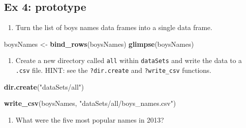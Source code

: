 \documentclass[]{book}
\newenvironment{Shaded}{\begin{snugshade}}{\end{snugshade}}
\newcommand{\KeywordTok}[1]{\textcolor[rgb]{0.13,0.29,0.53}{\textbf{#1}}}
\newcommand{\DecValTok}[1]{\textcolor[rgb]{0.00,0.00,0.81}{#1}}
\newcommand{\StringTok}[1]{\textcolor[rgb]{0.31,0.60,0.02}{#1}}
\newcommand{\OperatorTok}[1]{\textcolor[rgb]{0.81,0.36,0.00}{\textbf{#1}}}
\newcommand{\NormalTok}[1]{#1}
\providecommand{\tightlist}{%
  \setlength{\itemsep}{0pt}\setlength{\parskip}{0pt}}
\begin{document}
\subsection{Ex 4: prototype}\label{ex-4-prototype-1}

\begin{enumerate}
\def\labelenumi{\arabic{enumi}.}
\tightlist
\item
  Turn the list of boys names data frames into a single data frame.
\end{enumerate}

\begin{Shaded}
\begin{Highlighting}[]
\NormalTok{boysNames <-}\StringTok{ }\KeywordTok{bind_rows}\NormalTok{(boysNames)}
\KeywordTok{glimpse}\NormalTok{(boysNames)}
\end{Highlighting}
\end{Shaded}

\begin{enumerate}
\def\labelenumi{\arabic{enumi}.}
\setcounter{enumi}{1}
\tightlist
\item
  Create a new directory called \texttt{all} within \texttt{dataSets}
  and write the data to a \texttt{.csv} file. HINT: see the
  \texttt{?dir.create} and \texttt{?write\_csv} functions.
\end{enumerate}

\begin{Shaded}
\begin{Highlighting}[]
\KeywordTok{dir.create}\NormalTok{(}\StringTok{"dataSets/all"}\NormalTok{)}

\KeywordTok{write_csv}\NormalTok{(boysNames, }\StringTok{"dataSets/all/boys_names.csv"}\NormalTok{)}
\end{Highlighting}
\end{Shaded}

\begin{enumerate}
\def\labelenumi{\arabic{enumi}.}
\setcounter{enumi}{2}
\tightlist
\item
  What were the five most popular names in 2013?
\end{enumerate}

\begin{Shaded}
\end{Shaded}
\end{document}
